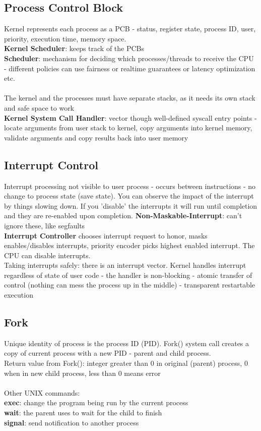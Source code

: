 \documentclass{article}
\begin{document}
\subsection{Process Control Block}
Kernel represents each process as a PCB - status, register state, process ID, user, priority, execution time, memory space. \\
\textbf{Kernel Scheduler}: keeps track of the PCBs \\
\textbf{Scheduler}: mechanism for deciding which processes/threads to receive the CPU - different policies can use fairness or realtime guarantees or latency optimization etc. \\ \\
The kernel and the processes must have separate stacks, as it needs its own stack and safe space to work \\ 
\textbf{Kernel System Call Handler}: vector though well-defined syscall entry points - locate arguments from user stack to kernel, copy arguments into kernel memory, validate arguments and copy results back into user memory
\subsection{Interrupt Control}
Interrupt processing not visible to user process - occurs between instructions - no change to process state (save state). You can observe the impact of the interrupt by things slowing down. If you 'disable' the interrupts it will run until completion and they are re-enabled upon completion. \textbf{Non-Maskable-Interrupt}: can't ignore these, like segfaults \\ 
\textbf{Interrupt Controller} chooses interrupt request to honor, masks enables/disables interrupts, priority encoder picks highest enabled interrupt. The CPU can disable interrupts. \\
Taking interrupts safely: there is an interrupt vector. Kernel handles interrupt regardless of state of user code - the handler is non-blocking - atomic transfer of control (nothing can mess the process up in the middle) - transparent restartable execution
\subsection{Fork}
Unique identity of process is the process ID (PID). Fork() system call creates a copy of current process with a new PID - parent and child process. \\
Return value from Fork(): integer greater than 0 in original (parent) process, 0 when in new child process, less than 0 means error \\ \\
Other UNIX commands: \\
\textbf{exec}: change the program being run by the current process \\ 
\textbf{wait}: the parent uses to wait for the child to finish \\ 
\textbf{signal}: send notification to another process
\end{document}
